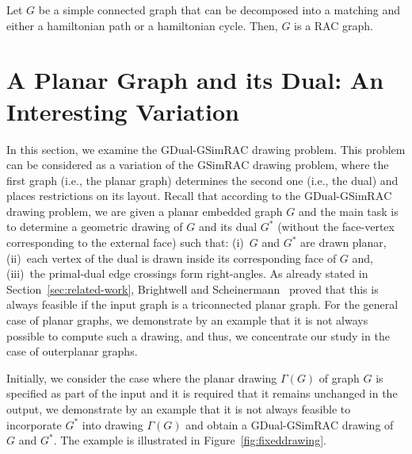 \documentclass{llncs}
\newcommand{\GSimRAC}{\mathrm{GSimRAC}}
\newcommand{\GDual}{\mathrm{GDual\text{-}GSimRAC}}
\begin{document}
\begin{corollary}
\label{cor:cycle-matching} Let $G$ be a simple connected graph that
can be decomposed into a matching and either a hamiltonian path or a
hamiltonian cycle. Then, $G$ is a RAC graph.
\end{corollary}



\section{A Planar Graph and its Dual: An Interesting Variation}
\label{sec:planar-dual}


In this section, we examine the  $\GDual$ drawing problem. This
problem can be considered as a variation of the $\GSimRAC$ drawing
problem, where the first graph (i.e., the planar graph) determines
the second one (i.e., the dual) and places restrictions on its
layout. Recall that according to the $\GDual$ drawing problem, we
are given a planar embedded graph $G$ and the main task is to
determine a geometric drawing of $G$ and its dual $G^*$ (without the
face-vertex corresponding to the external face) such that: (i)~$G$
and $G^*$ are drawn planar, (ii)~each vertex of the dual is drawn
inside its corresponding face of $G$ and, (iii)~the primal-dual edge
crossings form right-angles. As already stated in
Section~\ref{sec:related-work}, Brightwell and
Scheinermann~\cite{BS93} proved that this is always feasible if the
input graph is a triconnected planar graph. For the general case of
planar graphs, we demonstrate by an example that it is not always
possible to compute such a drawing, and thus, we concentrate our
study in the case of outerplanar graphs.




Initially, we consider the case where the planar drawing $\Gamma(G)$
of graph $G$ is specified as part of the input and it is required
that it remains unchanged in the output, we demonstrate by an
example that it is not always feasible to incorporate $G^*$ into
drawing $\Gamma(G)$ and obtain a $\GDual$ drawing of $G$ and $G^*$.
The example is illustrated in Figure~\ref{fig:fixeddrawing}.
\end{document}
